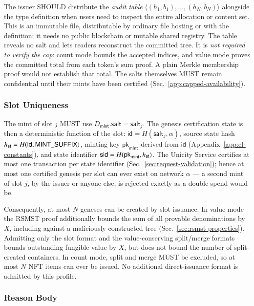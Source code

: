 The issuer SHOULD distribute the \emph{audit table} $\langle(h_1, b_1), \ldots, (h_N, b_N)\rangle$ alongside the type definition when users need to inspect the entire allocation or content set. This is an immutable file, distributable by ordinary file hosting or with the definition; it needs no public blockchain or mutable shared registry. The table reveals no salt and lets readers reconstruct the committed tree. It is \emph{not required to verify the cap}: count mode bounds the accepted indices, and value mode proves the committed total from each token's sum proof. A plain Merkle membership proof would not establish that total. The salts themselves MUST remain confidential until their mints have been certified (Sec.~\ref{app:capped-availability}).

\subsubsection{Slot Uniqueness}

The mint of slot $j$ MUST use $D_\mathsf{mint}.\mathsf{salt} = \mathsf{salt}_j$. The genesis certification state is then a deterministic function of the slot: $\mathsf{id} = H(\mathsf{salt}_j, \alpha)$, source state hash ${h_\mathsf{st}} = H(\mathsf{id}, \mathsf{MINT\_SUFFIX})$, minting key $\mathsf{pk}_\mathsf{mint}$ derived from $\mathsf{id}$ (Appendix~\ref{app:el-constants}), and state identifier $\mathsf{sid} = H(\mathsf{pk}_\mathsf{mint}, {h_\mathsf{st}})$. The Unicity Service certifies at most one transaction per state identifier (Sec.~\ref{sec:request-validation}); hence at most one certified genesis per slot can ever exist on network $\alpha$ --- a second mint of slot $j$, by the issuer or anyone else, is rejected exactly as a double spend would be.

Consequently, at most $N$ geneses can be created by slot issuance. In value mode the RSMST proof additionally bounds the sum of all provable denominations by $X$, including against a maliciously constructed tree (Sec.~\ref{sec:rsmst-properties}). Admitting only the slot format and the value-conserving split/merge formats bounds outstanding fungible value by $X$, but does not bound the number of split-created containers. In count mode, split and merge MUST be excluded, so at most $N$ NFT items can ever be issued. No additional direct-issuance format is admitted by this profile.

\subsubsection{Reason Body}

